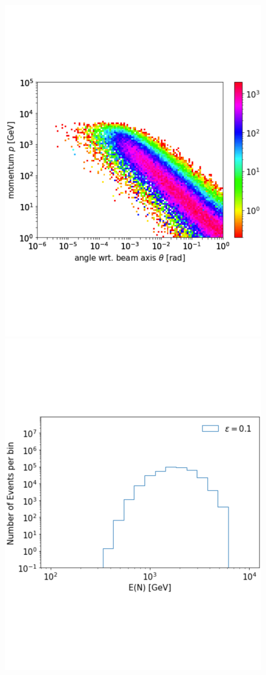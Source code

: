 \documentclass[
	11pt, %
]{beamer}
\begin{document}
\begin{frame}
\begin{figure}
	\includegraphics[scale=.18]{HNL_spectra.pdf}
	\includegraphics[scale=.18]{NE.pdf}

\end{figure}
\end{frame}
\end{document}
